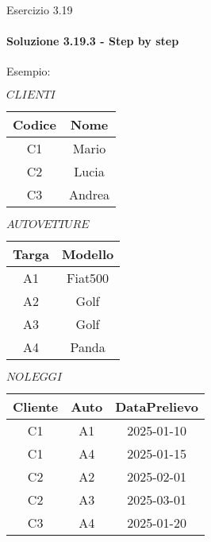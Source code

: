 \begin{frame}{Esercizio 3.19}
    \framesubtitle{Soluzione 3.19.3 - Step by step}
    \vspace*{-2cm}

    {\small Esempio:}
    \begin{minipage}{.33\textwidth}
    \small
    \centering
    $CLIENTI$

    \begin{tabular}{|c|c|}
    \hline
    \rowcolor{cyan!30} Codice  & Nome \\
    \hline
    C1 & Mario \\
    \hline
    C2 & Lucia \\
    \hline
    C3 & Andrea \\
    \hline
    \end{tabular}
    \end{minipage}%
    \begin{minipage}{.33\textwidth}
    \small
    \centering
    $AUTOVETTURE$
    \begin{tabular}{|c|c|}
    \hline
    \rowcolor{cyan!30} Targa  & Modello \\
    \hline
    A1 & Fiat500 \\
    \hline
    A2 & Golf \\
    \hline
    A3 & Golf \\
    \hline
    A4 & Panda \\
    \hline
    \end{tabular}
    \end{minipage}%
    \begin{minipage}{.33\textwidth}
    \small
    \centering
    $NOLEGGI$
    \begin{tabular}{|c|c|c|}
    \hline
    \rowcolor{cyan!30} Cliente  & Auto & DataPrelievo \\
    \hline
    C1 & A1 & 2025-01-10 \\
    \hline
    C1 & A4 & 2025-01-15 \\
    \hline
    C2 & A2 & 2025-02-01 \\
    \hline
    C2 & A3 & 2025-03-01 \\
    \hline
    C3 & A4 & 2025-01-20 \\
    \hline
    \end{tabular}
    \end{minipage}
    
\end{frame}
%
